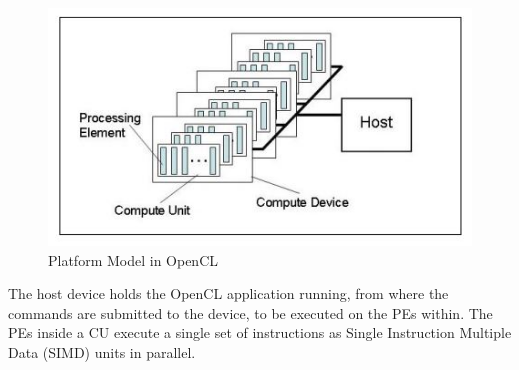 \begin{figure}[h!]
  \includegraphics[width=\linewidth]{figures/OpenCL_Platform_Model.JPG}
  \caption{Platform Model in OpenCL}
  \label{fig:opencl1}
\end{figure}
The host device holds the OpenCL application running, from where the commands are submitted to the device, to be executed on the PEs within. The PEs inside a CU execute a single set of instructions as Single Instruction Multiple Data (SIMD) units in parallel. 

